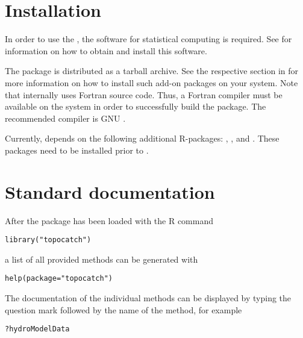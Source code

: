 \section{Installation} \label{sec:topocatch-install}

In order to use the , the  software for statistical computing is required. See \citet{Echse-Install-Doc} for information on how to obtain and install this software.

The  package is distributed as a tarball archive. See the respective section in \citet{Echse-Install-Doc} for more information on how to install such add-on packages on your system. Note that  internally uses Fortran source code. Thus, a Fortran compiler must be available on the system in order to successfully build the package. The recommended compiler is GNU .

Currently,  depends on the following additional R-packages: , , and . These packages need to be installed prior to .

\section{Standard documentation} \label{sec:topocatch:docs}

After the  package has been loaded with the R command

\begin{lstlisting}[style=R]
library("topocatch")
\end{lstlisting}

a list of all provided methods can be generated with

\begin{lstlisting}[style=R]
help(package="topocatch")
\end{lstlisting}

The documentation of the individual methods can be displayed by typing the question mark followed by the name of the method, for example

\begin{lstlisting}[style=R]
?hydroModelData
\end{lstlisting}

